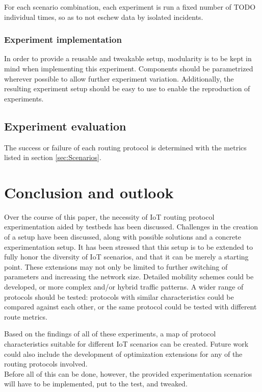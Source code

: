 \documentclass{acm_proc_article-sp}
\begin{document}
For each scenario combination, each experiment is run a fixed number of TODO individual times, so as to not eschew data by isolated incidents.

\subsubsection{Experiment implementation}
\label{subsec:implementation}
In order to provide a reusable and tweakable setup, modularity is to be kept in mind when implementing this experiment. Components should be parametrized wherever possible to allow further experiment variation. Additionally, the resulting experiment setup should be easy to use to enable the reproduction of experiments.

\subsection{Experiment evaluation}
\label{subsec:evaluation}
The success or failure of each routing protocol is determined with the metrics listed in section \ref{sec:Scenarios}.

\section{Conclusion and outlook}
\label{sec:Conclusion}
Over the course of this paper, the necessity of IoT routing protocol experimentation aided by testbeds has been discussed. Challenges in the creation of a setup have been discussed, along with possible solutions and a concrete experimentation setup. It has been stressed that this setup is to be extended to fully honor the diversity of IoT scenarios, and that it can be merely a starting point. These extensions may not only be limited to further switching of parameters and increasing the network size. Detailed mobility schemes could be developed, or more complex and/or hybrid traffic patterns. A wider range of protocols should be tested: protocols with similar characteristics could be compared against each other, or the same protocol could be tested with different route metrics.

Based on the findings of all of these experiments, a map of protocol characteristics suitable for different IoT scenarios can be created. Future work could also include the development of optimization extensions for any of the routing protocols involved.\\
Before all of this can be done, however, the provided experimentation scenarios will have to be implemented, put to the test, and tweaked.



\end{document}
